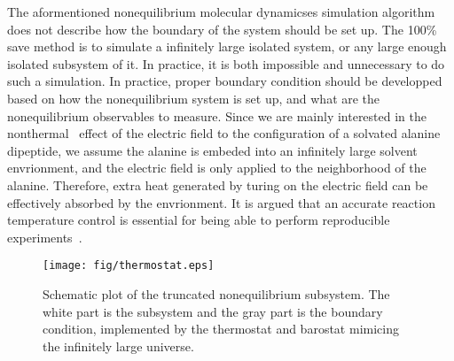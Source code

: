 \documentclass[aip,jcp,a4paper,preprint,onecolumn]{revtex4-1}
\begin{document}
The aformentioned nonequilibrium molecular dynamicses simulation algorithm
does not describe how the boundary of the system should be set up. The 100\% save
method is to simulate a infinitely large isolated system, or any large enough
isolated subsystem of it. In practice, it is both impossible and unnecessary to
do such a simulation. In practice, proper boundary condition should be developped
based on how the nonequilibrium system is set up, and what are the nonequilibrium
observables to measure.
Since we are mainly interested in the nonthermal~\cite{delaHoz2005microwaves} effect of
the electric field to the configuration of a solvated alanine dipeptide,
we assume the alanine is embeded into an infinitely large solvent envrionment,
and the electric field is only applied to the neighborhood of the alanine.
Therefore, 
extra heat generated by turing on the electric field can be effectively absorbed
by the envrionment.
It is argued that 
an accurate reaction temperature control is essential for being able to perform
reproducible experiments~\cite{damm2012can}.

\begin{figure}
  \centering
  \texttt{[image: fig/thermostat.eps]}
  \caption{Schematic plot of the truncated nonequilibrium subsystem.
    The white part is the subsystem and the gray part is the boundary
    condition, implemented by the thermostat and barostat mimicing
    the infinitely large universe.}
  \label{fig:tmp2}
\end{figure}
\end{document}
